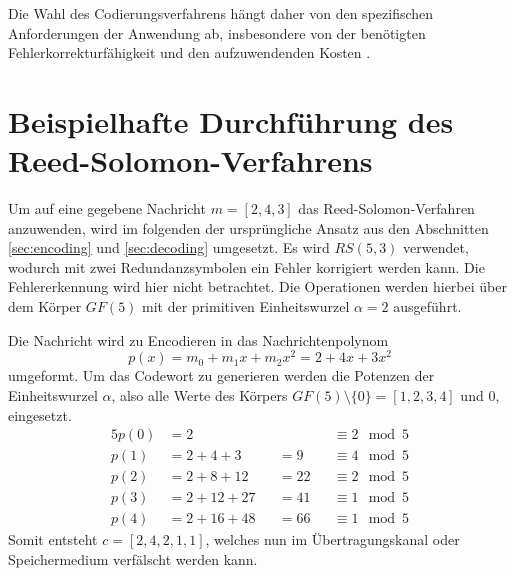Die Wahl des Codierungsverfahrens hängt daher von den spezifischen Anforderungen der Anwendung ab, insbesondere von der benötigten Fehlerkorrekturfähigkeit und den aufzuwendenden Kosten \cite{abrhaComparisonHammingBCH2019}.

\section{Beispielhafte Durchführung des Reed-Solomon-Verfahrens}\label{app:example}

Um auf eine gegebene Nachricht $m=[2,4,3]$ das Reed-Solomon-Verfahren anzuwenden, wird im folgenden der ursprüngliche Ansatz aus den Abschnitten \ref{sec:encoding} und \ref{sec:decoding} umgesetzt.
Es wird $RS(5, 3)$ verwendet, wodurch mit zwei Redundanzsymbolen ein Fehler korrigiert werden kann.
Die Fehlererkennung wird hier nicht betrachtet.
Die Operationen werden hierbei über dem Körper $GF(5)$ mit der primitiven Einheitswurzel $\alpha=2$ ausgeführt.

Die Nachricht wird zu Encodieren in das Nachrichtenpolynom \[p(x)=m_0+m_1x+m_2x^2=2+4x+3x^2\] umgeformt.
Um das Codewort zu generieren werden die Potenzen der Einheitswurzel $\alpha$, also alle Werte des Körpers $GF(5)\setminus\{0\}=[1,2,3,4]$ und 0, eingesetzt.
\begin{alignat}{5}
p(0)&=2      &&    &&\equiv2\mod5 \nonumber\\
p(1)&=2+4+3  &&=9  &&\equiv4\mod5 \nonumber\\
p(2)&=2+8+12 &&=22 &&\equiv2\mod5 \nonumber\\
p(3)&=2+12+27&&=41 &&\equiv1\mod5 \nonumber\\
p(4)&=2+16+48&&=66 &&\equiv1\mod5 \nonumber
\end{alignat}
Somit entsteht $c=[2,4,2,1,1]$, welches nun im Übertragungskanal oder Speichermedium verfälscht werden kann.

